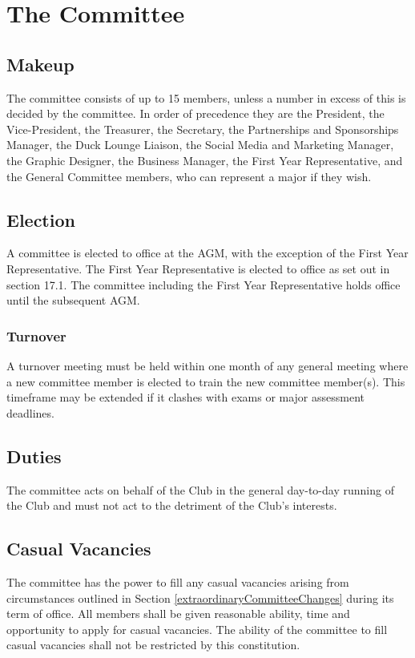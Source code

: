 \documentclass[11pt]{article}
\begin{document}
\section{The Committee} \label{theCommittee}
\subsection{Makeup} \label{committeeMakeup}
The committee consists of up to 15 members, unless a number in excess of this is decided by the committee. In order of precedence they are the President, the Vice-President, the Treasurer, the Secretary, the Partnerships and Sponsorships Manager, the Duck Lounge Liaison, the Social Media and Marketing Manager, the Graphic Designer, the Business Manager, the First Year Representative, and the General Committee members, who can represent a major if they wish.

\subsection{Election}
A committee is elected to office at the AGM, with the exception of the First Year Representative. The First Year Representative is elected to office as set out in section 17.1. The committee including the First Year Representative holds office until the subsequent AGM.
\subsubsection{Turnover}
A turnover meeting must be held within one month of any general meeting where a new committee member is elected to train the new committee member(s). This timeframe may be extended if it clashes with exams or major assessment deadlines.

\subsection{Duties}
The committee acts on behalf of the Club in the general day-to-day running of the Club and must not act to the detriment of the Club’s interests.

\subsection{Casual Vacancies} \label{committeeCasualVacancies}
The committee has the power to fill any casual vacancies arising from circumstances outlined in Section \ref{extraordinaryCommitteeChanges} during its term of office. All members shall be given reasonable ability, time and opportunity to apply for casual vacancies. The ability of the committee to fill casual vacancies shall not be restricted by this constitution.
\end{document}
